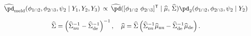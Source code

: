 \begin{equation}
\begin{gathered}
  \widehat{\pd}_{\text{meld}} (\phi_{1 \cap 2}, \phi_{2 \cap 3}, \psi_{2} \mid Y_{1}, Y_{2}, Y_{3})
  \, \propto \,
  \widehat{\pd}([\phi_{1 \cap 2} \,\, \phi_{2 \cap 3}]^{\mathsf{T}} \mid \widehat{\mu}, \, \widehat{\Sigma})
  \pd_{2}(\phi_{1 \cap 2}, \phi_{2 \cap 3}, \psi_{2} \mid Y_{2}) \\[1.5ex]
    \widehat{\Sigma} = \left(
      \widehat{\Sigma}_{\text{nu}}^{-1} - \widehat{\Sigma}_{\text{de}}^{-1}
    \right)^{-1}, \quad
    \widehat{\mu} = \widehat{\Sigma} \left(
      \widehat{\Sigma}_{\text{nu}}^{-1}\widehat{\mu}_{\text{nu}} - \widehat{\Sigma}_{\text{de}}^{-1}\widehat{\mu}_{\text{de}}
    \right).
\end{gathered}
\label{eqn:final-normal-approx-appendix}
\end{equation}